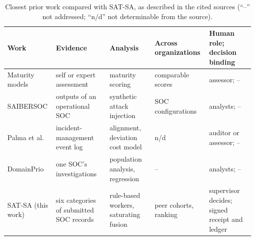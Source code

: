 \begin{table}[!htbp]
\caption{Closest prior work compared with SAT-SA, as described in the cited sources
(``--'' not addressed; ``n/d'' not determinable from the source).}
\label{tab:related}
\centering
\small
\setlength{\tabcolsep}{3pt}
\begin{tabular}{@{}L{2.4cm}L{2.3cm}L{2.3cm}L{2.1cm}L{2.1cm}@{}}
\toprule
Work & Evidence & Analysis & Across organizations & Human role; decision binding \\
\midrule
Maturity models \cite{vanos2016soccmm,schlette2021ctisoc2m2} & self or expert assessment & maturity scoring & comparable scores & assessor; -- \\
SAIBERSOC \cite{rosso2020saibersoc} & outputs of an operational SOC & synthetic attack injection & SOC configurations & analysts; -- \\
Palma et al.\ \cite{palma2024compliance,palma2025impavid} & incident-management event log & alignment, deviation cost model & n/d & auditor or assessor; -- \\
DomainPrio \cite{chiba2022domainprio} & one SOC's investigations & population analysis, regression & -- & analysts; -- \\
SAT-SA (this work) & six categories of submitted SOC records & rule-based workers, saturating fusion & peer cohorts, ranking & supervisor decides; signed receipt and ledger \\
\bottomrule
\end{tabular}
\end{table}
